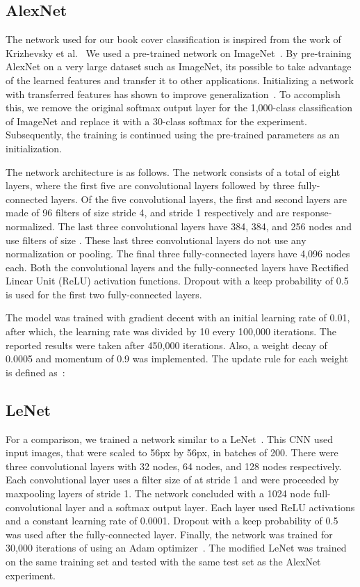 \documentclass[conference]{IEEEtran}
\begin{document}
\subsection{AlexNet}
The network used for our book cover classification is inspired from the work of Krizhevsky et al.~\cite{krizhevsky2012imagenet} 
We used a pre-trained network on ImageNet~\cite{imagenet_cvpr09}.
By pre-training AlexNet on a very large dataset such as ImageNet, its possible to take advantage of the learned features and transfer it to other applications.
Initializing a network with transferred features has shown to improve generalization~\cite{yosinski2014transferable}.
To accomplish this, we remove the original softmax output layer for the 1,000-class classification of ImageNet and replace it with a 30-class softmax for the experiment.
Subsequently, the training is continued using the pre-trained parameters as an initialization.


The network architecture is as follows.
The network consists of a total of eight layers, where the first five are convolutional layers followed by three fully-connected layers. 
Of the five convolutional layers, the first and second layers are made of 96 filters of size  stride 4, and  stride 1 respectively and are response-normalized.
The last three convolutional layers have 384, 384, and 256 nodes and use filters of size .
These last three convolutional layers do not use any normalization or pooling.
The final three fully-connected layers have 4,096 nodes each.
Both the convolutional layers and the fully-connected layers have Rectified Linear Unit (ReLU) activation functions.
Dropout with a keep probability of 0.5 is used for the first two fully-connected layers.

The model was trained with gradient decent with an initial learning rate of 0.01, after which, the learning rate was divided by 10 every 100,000 iterations.
The reported results were taken after 450,000 iterations.
Also, a weight decay of 0.0005 and momentum of 0.9 was implemented.
The update rule for each weight  is defined as~\cite{krizhevsky2012imagenet}:



\subsection{LeNet}
For a comparison, we trained a network similar to a LeNet~\cite{lecun1998gradient}.
This CNN used input images, that were scaled to 56px by 56px, in batches of 200.
There were three convolutional layers with 32 nodes, 64 nodes, and 128 nodes respectively.
Each convolutional layer uses a filter size of  at stride 1 and were proceeded by maxpooling layers of  stride 1.
The network concluded with a 1024 node full-convolutional layer and a softmax output layer.
Each layer used ReLU activations and a constant learning rate of 0.0001.
Dropout with a keep probability of 0.5 was used after the fully-connected layer.
Finally, the network was trained for 30,000 iterations of using an Adam optimizer~\cite{kingma2014adam}. 
The modified LeNet was trained on the same training set and tested with the same test set as the AlexNet experiment.
\end{document}
